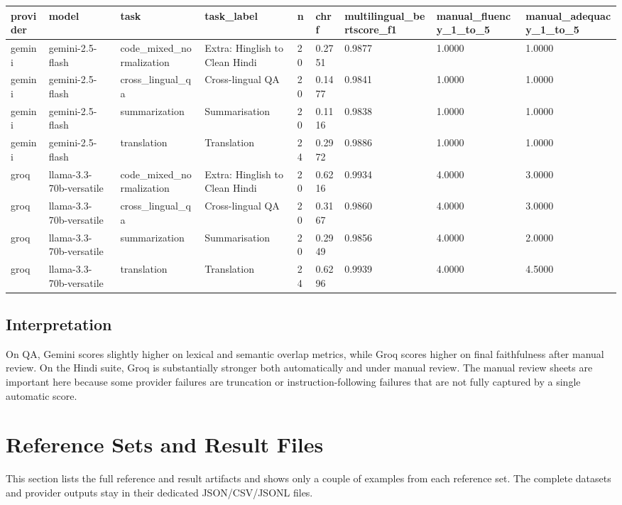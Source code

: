 \documentclass[11pt]{article}
\begin{document}
        \begin{center}
\small\begin{tabular}{p{}|p{}|p{}|p{}|p{}|p{}|p{}|p{}|p{}}
\hline
provider & model & task & task\_label & n & chrf & multilingual\_bertscore\_f1 & manual\_fluency\_1\_to\_5 & manual\_adequacy\_1\_to\_5 \\ \hline
gemini & gemini-2.5-flash & code\_mixed\_normalization & Extra: Hinglish to Clean Hindi & 20 & 0.2751 & 0.9877 & 1.0000 & 1.0000 \\ \hline
gemini & gemini-2.5-flash & cross\_lingual\_qa & Cross-lingual QA & 20 & 0.1477 & 0.9841 & 1.0000 & 1.0000 \\ \hline
gemini & gemini-2.5-flash & summarization & Summarisation & 20 & 0.1116 & 0.9838 & 1.0000 & 1.0000 \\ \hline
gemini & gemini-2.5-flash & translation & Translation & 24 & 0.2972 & 0.9886 & 1.0000 & 1.0000 \\ \hline
groq & llama-3.3-70b-versatile & code\_mixed\_normalization & Extra: Hinglish to Clean Hindi & 20 & 0.6216 & 0.9934 & 4.0000 & 3.0000 \\ \hline
groq & llama-3.3-70b-versatile & cross\_lingual\_qa & Cross-lingual QA & 20 & 0.3167 & 0.9860 & 4.0000 & 3.0000 \\ \hline
groq & llama-3.3-70b-versatile & summarization & Summarisation & 20 & 0.2949 & 0.9856 & 4.0000 & 2.0000 \\ \hline
groq & llama-3.3-70b-versatile & translation & Translation & 24 & 0.6296 & 0.9939 & 4.0000 & 4.5000 \\ \hline
\end{tabular}
\end{center}

        \subsection*{Interpretation}
        On QA, Gemini scores slightly higher on lexical and semantic overlap metrics, while Groq scores higher on final faithfulness after manual review. On the Hindi suite, Groq is substantially stronger both automatically and under manual review. The manual review sheets are important here because some provider failures are truncation or instruction-following failures that are not fully captured by a single automatic score.

        \section*{Reference Sets and Result Files}
        This section lists the full reference and result artifacts and shows only a couple of examples from each reference set. The complete datasets and provider outputs stay in their dedicated JSON/CSV/JSONL files.
\end{document}
